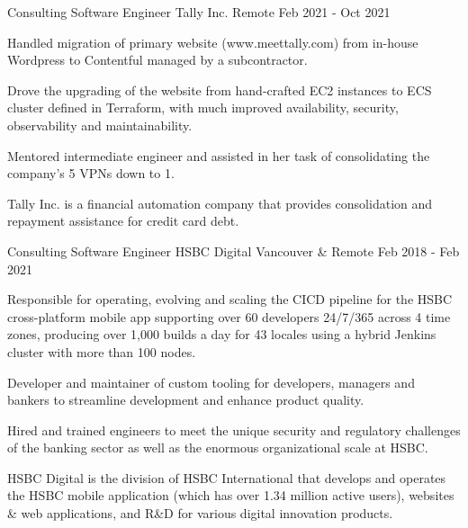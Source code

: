 \begin{cventries}
  \cventrywithsummary
    {Consulting Software Engineer} %
    {Tally Inc.} %
    {Remote} %
    {Feb 2021 - Oct 2021} %
    {
      \begin{cvitems} %
        \item {Handled migration of primary website (www.meettally.com) from in-house Wordpress to Contentful managed by a subcontractor.}
        \item {Drove the upgrading of the website from hand-crafted EC2 instances to ECS cluster defined in Terraform, with much improved availability, security, observability and maintainability.}
        \item {Mentored intermediate engineer and assisted in her task of consolidating the company's 5 VPNs down to 1.}
      \end{cvitems}
    }
    {
      Tally Inc. is a financial automation company that provides consolidation and repayment assistance for credit card debt.
    }

  \cventrywithsummary
    {Consulting Software Engineer} %
    {HSBC Digital} %
    {Vancouver \& Remote} %
    {Feb 2018 - Feb 2021} %
    {
      \begin{cvitems} %
        \item {Responsible for operating, evolving and scaling the CICD pipeline for the HSBC cross-platform mobile app supporting over 60 developers 24/7/365 across 4 time zones, producing over 1,000 builds a day for 43 locales using a hybrid Jenkins cluster with more than 100 nodes.}
        \item {Developer and maintainer of custom tooling for developers, managers and bankers to streamline development and enhance product quality.}
        \item {Hired and trained engineers to meet the unique security and regulatory challenges of the banking sector as well as the enormous organizational scale at HSBC. }
      \end{cvitems}
    }
    {
      HSBC Digital is the division of HSBC International that develops and operates the HSBC mobile application (which has over 1.34 million active users), websites \& web applications, and R\&D for various digital innovation products.
    }


\end{cventries}
